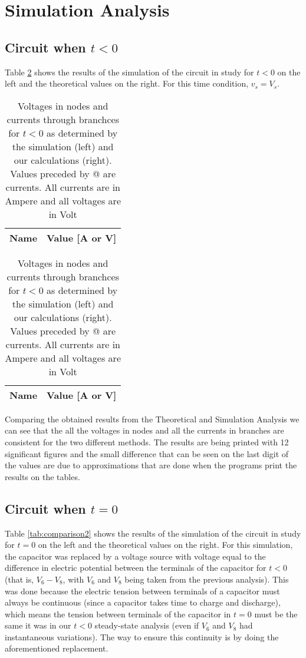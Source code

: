 \section{Simulation Analysis}
\label{sec:simulation}

\subsection{Circuit when $t<0$}

Table \ref{tab:comparison1} shows the results of the simulation of the circuit in study for $t<0$ on the left and the theoretical values on the right. For this time condition, $v_s = V_s$.

\begin{table}[H]
  \centering
  \begin{tabular}{|c|c|}
    \hline    
    {\bf Name} & {\bf Value [A or V]} \\ \hline
    
  \end{tabular}
  \begin{tabular}{|c|c|}
    \hline    
    {\bf Name} & {\bf Value [A or V]} \\ \hline
    
  \end{tabular}
  \caption{Voltages in nodes and currents through branchces for $t<0$ as determined by the simulation (left) and our calculations (right). Values preceded by @ are currents. All currents are in Ampere and all voltages are in Volt}
  \label{tab:comparison1}
\end{table}

Comparing the obtained results from the Theoretical and Simulation Analysis we can see that the all the voltages in nodes and all the currents in branches are consistent for the two different methods. The results are being printed with 12 significant figures and the small difference that can be seen on the last digit of the values are due to approximations that are done when the programs print the results on the tables.

\subsection{Circuit when $t=0$}

Table \ref{tab:comparison2} shows the results of the simulation of the circuit in study for $t=0$ on the left and the theoretical values on the right. For this simulation, the capacitor was replaced by a voltage source with voltage equal to the difference in electric potential between the terminals of the capacitor for $t<0$ (that is, $V_6 - V_8$, with $V_6$ and $V_8$ being taken from the previous analysis). This was done because the electric tension between terminals of a capacitor must always be continuous (since a capacitor takes time to charge and discharge), which means the tension between terminals of the capacitor in $t=0$ must be the same it was in our $t<0$ steady-state analysis (even if $V_6$ and $V_8$ had instantaneous variations). The way to ensure this continuity is by doing the aforementioned replacement.

